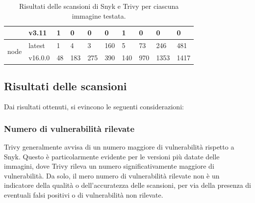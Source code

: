 \begin{table}[H]
\begin{tabularx}{\textwidth}{|l|l|X|X|X|X|X|X|X|X|}
                                 & v3.11          & 1                                  & 0                                   & 0            & 0            & 1              & 0             & 0            & 0            \\ \hline
      \multirow{2}{*}{node}      & latest         & 1                                  & 4                                   & 3            & 160          & 5              & 73            & 246          & 481          \\ \cline{2-10}
                                 & v16.0.0        & 48                                 & 183                                 & 275          & 390          & 140            & 970           & 1353         & 1417         \\ \hline
   \end{tabularx}
   \caption{Risultati delle scansioni di Snyk e Trivy per ciascuna immagine testata.}
   \label{tab:scan_results}
\end{table}
\subsection{Risultati delle scansioni}
Dai risultati ottenuti, si evincono le seguenti considerazioni:
\subsubsection{Numero di vulnerabilità rilevate}
Trivy generalmente avvisa di un numero maggiore di vulnerabilità rispetto a Snyk. Questo è particolarmente evidente per le versioni più datate delle immagini, dove Trivy rileva un numero significativamente maggiore di vulnerabilità. Da solo, il mero numero di vulnerabilità rilevate non è un indicatore della qualità o dell'accuratezza delle scansioni, per via della presenza di eventuali falsi positivi o di vulnerabilità non rilevate.


